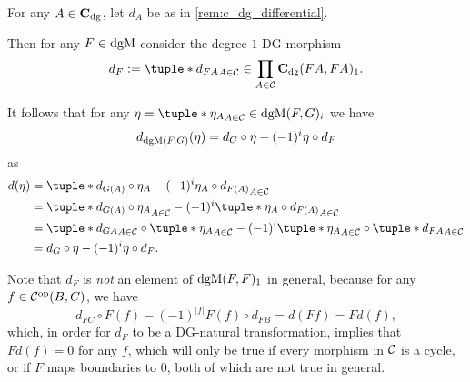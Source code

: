 \begin{remark}
    For any \( A \in \operatorname{\mathbf{C}}_{\operatorname{dg}} \), let \( d_A \) be as in \autoref{rem:c_dg_differential}.

    Then for any \( F \in \operatorname{dgM} \) consider the degree \( 1 \) DG-morphism
    \[
        d_F := \tuple*{d_{FA}}_{A \in \Cc} \in \prod_{A \in \Cc} \C_{\dg}(FA, FA)_1.
    \]

    It follows that for any \( \eta = \tuple*{\eta_A}_{A \in \Cc} \in \dgM(F, G)_i \) we have
    \[
        d_{\operatorname{dgM}(F, G)}(\eta) = d_G \circ \eta - (-1)^i \eta \circ d_F
    \]
    as
    \begin{align*}
        d(\eta) &= \tuple*{ d_{G(A)} \circ \eta_A - (-1)^i \eta_A \circ d_{F(A)} }_{A \in \Cc} \\
        &= \tuple*{ d_{G(A)} \circ \eta_A }_{A \in \Cc} - (-1)^i \tuple*{ \eta_A \circ d_{F(A)} }_{A \in \Cc} \\
        &= \tuple*{d_{G A}}_{A \in \Cc} \circ \tuple*{\eta_A}_{A \in \Cc} - (-1)^i \tuple*{\eta_A}_{A \in \Cc} \circ \tuple*{d_{F A}}_{A \in \Cc} \\
        &= d_G \circ \eta - (-1)^i \eta \circ d_F.
    \end{align*}
\end{remark}

Note that \( d_F \) is \emph{not} an element of \( \operatorname{dgM}(F, F)_1 \) in general, because for any \( f \in {\mathcal{C}}^{\operatorname{op}}(B, C) \), we have
\[
    d_{F C} \circ F(f) - (-1)^{|f|} F(f) \circ d_{F B} = d(F f) = F d(f),
\]
which, in order for \( d_F \) to be a DG-natural transformation, implies that \( F d(f) = 0 \) for any \( f \), which will only be true if every morphism in \( {\mathcal{C}} \) is a cycle, or if \( F \) maps boundaries to \( 0 \), both of which are not true in general.